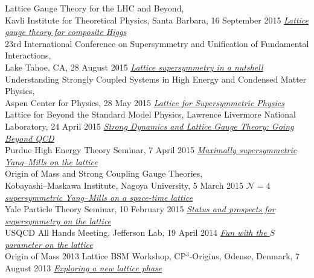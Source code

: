 \begin{spacelist}
\begin{revnumerate}
      Lattice Gauge Theory for the LHC and Beyond, \\ Kavli Institute for Theoretical Physics, Santa Barbara, 16 September 2015
    \pagebreakitem
      \textit{\href{http://www.davidschaich.net/talks/LGT4CH.pdf}{Lattice gauge theory for composite Higgs}} \\
      23rd International Conference on Supersymmetry and Unification of Fundamental Interactions, \\ Lake Tahoe, CA, 28 August 2015
    \pagebreakitem
      \textit{\href{http://www.davidschaich.net/talks/Aspen15.pdf}{Lattice supersymmetry in a nutshell}} \\
      Understanding Strongly Coupled Systems in High Energy and Condensed Matter Physics, \\ Aspen Center for Physics, 28 May 2015
    \pagebreakitem
      \textit{\href{http://www.davidschaich.net/talks/Livermore1504.pdf}{Lattice for Supersymmetric Physics}} \\
      Lattice for Beyond the Standard Model Physics, Lawrence Livermore National Laboratory, 24 April 2015
    \pagebreakitem
      \textit{\href{http://www.davidschaich.net/talks/Purdue1504.pdf}{Strong Dynamics and Lattice Gauge Theory: Going Beyond QCD}} \\
      Purdue High Energy Theory Seminar, 7 April 2015
    \pagebreakitem
      \textit{\href{http://www.davidschaich.net/talks/SCGT15.pdf}{Maximally supersymmetric Yang--Mills on the lattice}} \\
      Origin of Mass and Strong Coupling Gauge Theories, \\ Kobayashi--Maskawa Institute, Nagoya University, 5 March 2015
    \pagebreakitem
      \textit{\href{http://www.davidschaich.net/talks/Yale1502.pdf}{$\mathcal N = 4$ supersymmetric Yang--Mills on a space-time lattice}} \\
      Yale Particle Theory Seminar, 10 February 2015
    \pagebreakitem
      \textit{\href{http://www.davidschaich.net/talks/USQCD14.pdf}{Status and prospects for supersymmetry on the lattice}} \\
      USQCD All Hands Meeting, Jefferson Lab, 19 April 2014
    \pagebreakitem
      \textit{\href{http://www.davidschaich.net/talks/Mass13.pdf}{Fun with the $S$ parameter on the lattice}} \\
      Origin of Mass 2013 Lattice BSM Workshop, CP$^3$-Origins, Odense, Denmark, 7 August 2013
    \pagebreakitem
      \textit{\href{http://www.davidschaich.net/talks/Aspen13.pdf}{Exploring a new lattice phase}} \\

\end{revnumerate}
\end{spacelist}
